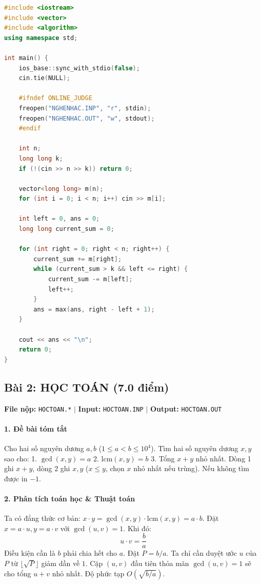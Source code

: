 \documentclass[11pt,a4paper]{article}
\begin{document}
\begin{lstlisting}[language=C++]
#include <iostream>
#include <vector>
#include <algorithm>
using namespace std;

int main() {
    ios_base::sync_with_stdio(false);
    cin.tie(NULL);

    #ifndef ONLINE_JUDGE
    freopen("NGHENHAC.INP", "r", stdin);
    freopen("NGHENHAC.OUT", "w", stdout);
    #endif

    int n;
    long long k;
    if (!(cin >> n >> k)) return 0;

    vector<long long> m(n);
    for (int i = 0; i < n; i++) cin >> m[i];

    int left = 0, ans = 0;
    long long current_sum = 0;

    for (int right = 0; right < n; right++) {
        current_sum += m[right];
        while (current_sum > k && left <= right) {
            current_sum -= m[left];
            left++;
        }
        ans = max(ans, right - left + 1);
    }

    cout << ans << "\n";
    return 0;
}
\end{lstlisting}

\newpage

\subsection{Bài 2: HỌC TOÁN (7.0 điểm)}
\textbf{File nộp:} \texttt{HOCTOAN.*} $\vert$ \textbf{Input:} \texttt{HOCTOAN.INP} $\vert$ \textbf{Output:} \texttt{HOCTOAN.OUT}

\paragraph{1. Đề bài tóm tắt}
Cho hai số nguyên dương $a, b$ ($1 \le a < b \le 10^4$). Tìm hai số nguyên dương $x, y$ sao cho:
1. $\gcd(x, y) = a$
2. $\text{lcm}(x, y) = b$
3. Tổng $x + y$ nhỏ nhất. Dòng 1 ghi $x + y$, dòng 2 ghi $x, y$ ($x \le y$, chọn $x$ nhỏ nhất nếu trùng). Nếu không tìm được in $-1$.

\paragraph{2. Phân tích toán học \& Thuật toán}
Ta có đẳng thức cơ bản: $x \cdot y = \gcd(x, y) \cdot \text{lcm}(x, y) = a \cdot b$.
Đặt $x = a \cdot u, y = a \cdot v$ với $\gcd(u, v) = 1$. Khi đó:
\[
u \cdot v = \frac{b}{a}
\]
Điều kiện cần là $b$ phải chia hết cho $a$. Đặt $P = b / a$. Ta chỉ cần duyệt ước $u$ của $P$ từ $\lfloor\sqrt{P}\rfloor$ giảm dần về $1$. Cặp $(u, v)$ đầu tiên thỏa mãn $\gcd(u, v) = 1$ sẽ cho tổng $u + v$ nhỏ nhất. Độ phức tạp $O(\sqrt{b/a})$.
\end{document}
